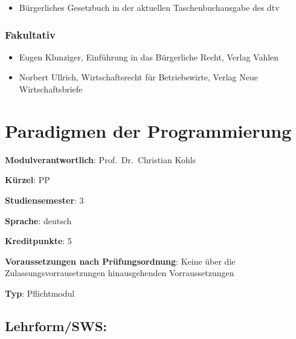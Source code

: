 \begin{itemize}
\tightlist
\item
  Bürgerliches Gesetzbuch in der aktuellen Taschenbuchausgabe des dtv
\end{itemize}

\subsection*{Fakultativ}\label{fakultativ}

\begin{itemize}
\tightlist
\item
  Eugen Klunziger, Einführung in das Bürgerliche Recht, Verlag Vahlen
\item
  Norbert Ullrich, Wirtschaftsrecht für Betriebswirte, Verlag Neue
  Wirtschaftsbriefe
\end{itemize}

\chapter{Paradigmen der
Programmierung}\label{paradigmen-der-programmierung}

\begin{modulHead}
\textbf{Modulverantwortlich}: Prof.~Dr.~Christian
Kohls
\end{modulHead}
\begin{modulHead}
\textbf{Kürzel}:
PP
\end{modulHead}
\begin{modulHead}
\textbf{Studiensemester}:
3
\end{modulHead}
\begin{modulHead}
\textbf{Sprache}:
deutsch
\end{modulHead}
\begin{modulHead}
\textbf{Kreditpunkte}:
5
\end{modulHead}
\begin{modulHead}
\textbf{Voraussetzungen nach
Prüfungsordnung}: Keine über die Zulassungsvorrausetzungen
hinausgehenden
Vorraussetzungen
\end{modulHead}
\begin{modulHead}
\textbf{Typ}:
Pflichtmodul
\end{modulHead}


\section*{Lehrform/SWS:}\label{lehrformsws-17}

